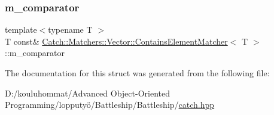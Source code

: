 \subsubsection{\texorpdfstring{m\+\_\+comparator}{m\_comparator}}
{\footnotesize\ttfamily template$<$typename T $>$ \\
T const\& \mbox{\hyperlink{struct_catch_1_1_matchers_1_1_vector_1_1_contains_element_matcher}{Catch\+::\+Matchers\+::\+Vector\+::\+Contains\+Element\+Matcher}}$<$ T $>$\+::m\+\_\+comparator}



The documentation for this struct was generated from the following file\+:\begin{DoxyCompactItemize}
\item 
D\+:/kouluhommat/\+Advanced Object-\/\+Oriented Programming/lopputyö/\+Battleship/\+Battleship/\mbox{\hyperlink{catch_8hpp}{catch.\+hpp}}\end{DoxyCompactItemize}

